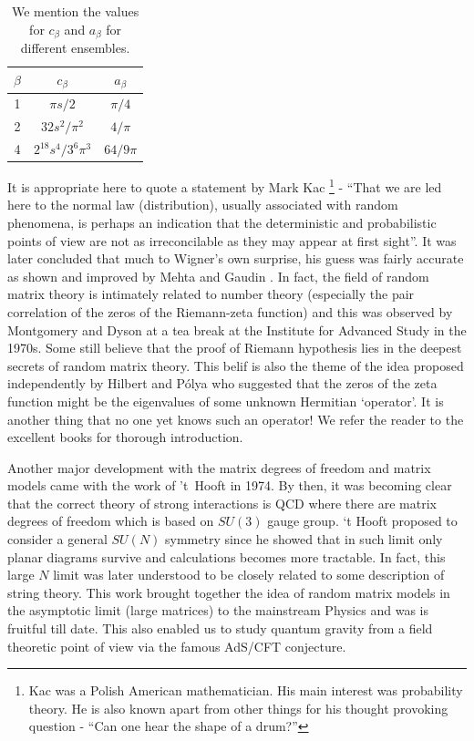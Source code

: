 \documentclass[11pt]{article}
\begin{document}
\begin{table}[h!]
	\centering
	\begin{tabular}{||c c c||} 
		\hline
		$\beta$ & $c_{\beta}$ & $a_{\beta}$ \\ [0.5ex] 
		\hline\hline
		1 & $\pi s/2$ & $\pi/4$  \\ 
		2 & $32 s^2/\pi^2$ & $4/\pi$  \\
		4 & $2^{18} s^4/3^6 \pi^3$ & $64/9\pi$
		 \\ [1ex] 
		\hline 
	\end{tabular}
\caption{We mention the values for $c_{\beta}$ and $a_{\beta}$ for different ensembles.}
\label{table:c_and_a}
\end{table}



It is appropriate here to quote a statement by Mark Kac 
\footnote{Kac was a Polish American mathematician. His main interest was probability theory. 
He is also known apart from other things for his thought provoking question - ``Can one hear 
the shape of a drum?''} - ``That we are led here to the normal law (distribution), usually associated with random phenomena, is perhaps
an indication that the deterministic and probabilistic points of view are not as irreconcilable as they may appear at first sight''. It was later concluded that much to Wigner's own surprise, 
his guess was fairly accurate as shown and improved by Mehta \cite{MEHTA1960395} and Gaudin \cite{GAUDIN1961447}.
In fact, the field of random matrix theory is intimately related to number theory (especially the pair correlation of the zeros of the Riemann-zeta function) and this was 
observed by Montgomery and Dyson at a tea break at the Institute for Advanced Study in the 1970s. Some still believe that the proof of Riemann hypothesis lies in the
deepest secrets of random matrix theory. This belif is also the theme of the idea proposed independently by  Hilbert and P\'{o}lya who suggested that the zeros of the zeta function might be the eigenvalues of some unknown Hermitian `operator'. It is another thing that no one yet knows such an operator! We refer the reader to the excellent books \cite{Meh2004, Akemann:2011csh} for thorough introduction. 

Another major development with the matrix degrees of freedom and matrix models came with the work of 't~Hooft in 1974. By then, it was becoming clear that the correct theory of strong interactions is QCD where there are matrix degrees of freedom
which is based on $SU(3)$ gauge group. `t Hooft proposed to consider a general $SU(N)$ symmetry 
since he showed that in such limit only planar diagrams survive and calculations becomes
more tractable. In fact, this large $N$ limit was later understood to be closely related to some
description of string theory. This work brought together the idea of random matrix models
in the asymptotic limit (large matrices) to the mainstream Physics and was is fruitful till date. 
This also enabled us to study quantum gravity from a field theoretic point of view via the famous
AdS/CFT conjecture.
\end{document}
